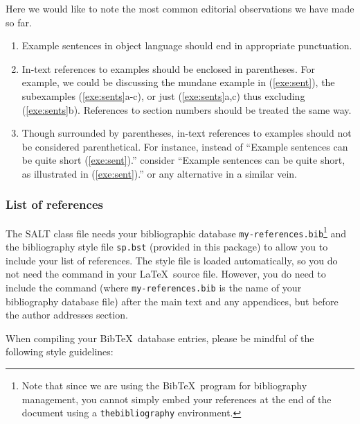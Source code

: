 \documentclass{salt}
\newcommand{\BibTeX}{{\sc Bib}\TeX }
\begin{document}
Here we would like to note the most common editorial observations we have made so far.

\begin{exe}
\ex 
\begin{enumerate}
\item Example sentences in object language should end in appropriate punctuation.
\item In-text references to examples should be enclosed in parentheses. For example, we could be discussing the mundane example in (\ref{exe:sent}), the subexamples (\ref{exe:sents}a-c), or just (\ref{exe:sents}a,c) thus excluding (\ref{exe:sents}b). References to section numbers should be treated the same way.
\item Though surrounded by parentheses, in-text references to examples should not be considered parenthetical. For instance, instead of ``Example sentences can be quite short (\ref{exe:sent}).'' consider ``Example sentences can be quite short, as illustrated in (\ref{exe:sent}).'' or any alternative in a similar vein.
\end{enumerate}
\end{exe}

\subsubsection{List of references}

The SALT class file needs your bibliographic database \verb+my-references.bib+\footnote{Note that since we are using the \BibTeX\ program for bibliography management, you cannot simply embed your references at the end of the document using a \texttt{thebibliography} environment.} and the bibliography style file \verb+sp.bst+ (provided in this package) to allow you to include your list of references. The style file is loaded automatically, so you do not need the command \verb++ in your \LaTeX\ source file. However, you do need to include the command \verb++ (where \verb+my-references.bib+ is the name of your bibliography database file) after the main text and any appendices, but before the author addresses section.  

When compiling your \BibTeX\ database entries, please be mindful of the following style guidelines: 
\end{document}
